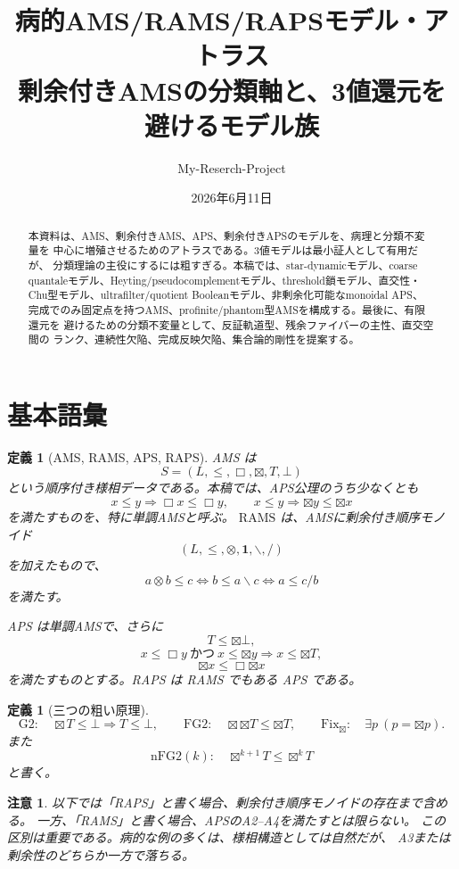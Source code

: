 \documentclass[uplatex,dvipdfmx,a4paper,10pt]{jsarticle}
\title{病的AMS/RAMS/RAPSモデル・アトラス\\
{\large 剰余付きAMSの分類軸と、3値還元を避けるモデル族}}
\author{My-Reserch-Project}
\date{2026年6月11日}
\newtheorem{definition}[theorem]{定義}
\newtheorem{remark}[theorem]{注意}
\newcommand{\RAMS}{\mathrm{RAMS}}
\newcommand{\Gtwo}{\mathrm{G2}}
\newcommand{\FGtwo}{\mathrm{FG2}}
\newcommand{\nFGtwo}{\mathrm{nFG2}}
\newcommand{\Fix}{\mathrm{Fix}}
\newcommand{\bt}{\boxtimes}
\newcommand{\resl}{\backslash}
\newcommand{\resr}{/}
\begin{document}
\maketitle

\begin{abstract}
本資料は、AMS、剰余付きAMS、APS、剰余付きAPSのモデルを、病理と分類不変量を
中心に増殖させるためのアトラスである。3値モデルは最小証人として有用だが、
分類理論の主役にするには粗すぎる。本稿では、star-dynamicモデル、coarse
quantaleモデル、Heyting/pseudocomplementモデル、threshold鎖モデル、直交性・
Chu型モデル、ultrafilter/quotient Booleanモデル、非剰余化可能なmonoidal APS、
完成でのみ固定点を持つAMS、profinite/phantom型AMSを構成する。最後に、有限還元を
避けるための分類不変量として、反証軌道型、残余ファイバーの主性、直交空間の
ランク、連続性欠陥、完成反映欠陥、集合論的剛性を提案する。
\end{abstract}

\section{基本語彙}

\begin{definition}[AMS, RAMS, APS, RAPS]
AMS は
\[
S=(L,\le,\Box,\bt,T,\bot)
\]
という順序付き様相データである。本稿では、APS公理のうち少なくとも
\[
x\le y\Rightarrow \Box x\le\Box y,\qquad
x\le y\Rightarrow \bt y\le\bt x
\]
を満たすものを、特に単調AMSと呼ぶ。
\(\RAMS\) は、AMSに剰余付き順序モノイド
\[
(L,\le,\otimes,\mathbf 1,\resl,\resr)
\]
を加えたもので、
\[
a\otimes b\le c
\iff
b\le a\resl c
\iff
a\le c\resr b
\]
を満たす。

APS は単調AMSで、さらに
\[
T\le\bt\bot,
\]
\[
x\le\Box y\ \text{かつ}\ x\le\bt y\Rightarrow x\le\bt T,
\]
\[
\bt x\le\Box\bt x
\]
を満たすものとする。RAPS は RAMS でもある APS である。
\end{definition}

\begin{definition}[三つの粗い原理]
\[
\Gtwo:\quad \bt T\le\bot\Rightarrow T\le\bot,
\qquad
\FGtwo:\quad \bt\bt T\le\bt T,
\qquad
\Fix_{\bt}:\quad \exists p\ (p=\bt p).
\]
また
\[
\nFGtwo(k):\quad \bt^{k+1}T\le\bt^kT
\]
と書く。
\end{definition}

\begin{remark}
以下では「RAPS」と書く場合、剰余付き順序モノイドの存在まで含める。
一方、「RAMS」と書く場合、APSのA2--A4を満たすとは限らない。
この区別は重要である。病的な例の多くは、様相構造としては自然だが、
A3または剰余性のどちらか一方で落ちる。
\end{remark}
\end{document}
